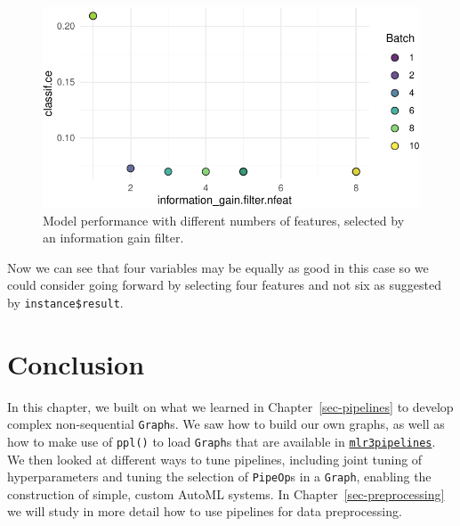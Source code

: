\begin{figure}[H]

{\centering \includegraphics[width=1\textwidth,height=\textheight]{chapters/chapter8/non-sequential_pipelines_and_tuning_files/figure-pdf/fig-tunefilter-1.pdf}

}

\caption{\label{fig-tunefilter}Model performance with different numbers
of features, selected by an information gain filter.}

\end{figure}

Now we can see that four variables may be equally as good in this case
so we could consider going forward by selecting four features and not
six as suggested by \texttt{instance\$result}.

\hypertarget{conclusion-6}{%
\section{Conclusion}\label{conclusion-6}}

In this chapter, we built on what we learned in
Chapter~\ref{sec-pipelines} to develop complex non-sequential
\texttt{Graph}s. We saw how to build our own graphs, as well as how to
make use of \texttt{ppl()} to load \texttt{Graph}s that are available in
\href{https://mlr3pipelines.mlr-org.com}{\texttt{mlr3pipelines}}.
We then looked at different ways to tune pipelines, including joint
tuning of hyperparameters and tuning the selection of \texttt{PipeOp}s
in a \texttt{Graph}, enabling the construction of simple, custom AutoML
systems. In Chapter~\ref{sec-preprocessing} we will study in more detail
how to use pipelines for data preprocessing.


